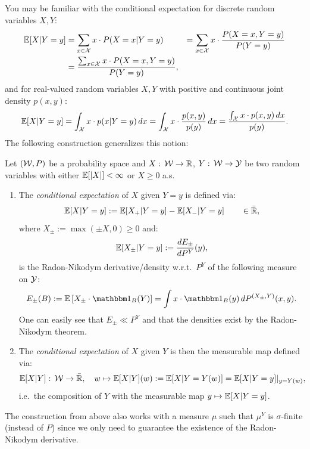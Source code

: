 You may be familiar with the conditional expectation for discrete random variables $X,Y$:
\begin{align*} 
    \mathbb{E}[X|Y=y] &= \sum_{x\in\mathcal{X}} x\cdot P(X=x|Y=y) 
&= \sum_{x \in \mathcal{X}} x \cdot \frac{P(X=x,Y=y)}{P(Y=y)} \\&= \frac{\sum_{x \in \mathcal{X}} x \cdot P(X=x,Y=y)}{P(Y=y)},
\end{align*}
and for real-valued random variables $X,Y$ with positive and continuous joint density $p(x,y)$: 
\[\mathbb{E}[X| Y=y] = \int_{\mathcal{X}} x \cdot p(x| Y=y) \,dx = \int_{\mathcal{X}} x \cdot \frac{p(x,y)}{p(y)} \,dx = \frac{\int_{\mathcal{X}} x \cdot p(x,y)\,dx}{p(y)}.\]
The following construction generalizes this notion:
\begin{Def}
    Let $(\mathcal{W},P)$ be a probability space
    and $X:\, \mathcal{W} \to \mathbb{R}$, $Y:\,\mathcal{W} \to \mathcal{Y}$ be two random variables with 
    either $\mathbb{E}[|X|]< \infty$ or $X \ge 0$ a.s.
\begin{enumerate}
         \item     The \emph{conditional expectation}  of $X$ given $Y=y$ is defined via:
     \[ \mathbb{E}[X|Y=y] := \mathbb{E}[X_+|Y=y] - \mathbb{E}[X_-|Y=y] \qquad \in \bar {\mathbb{R}}, \]
     where $X_\pm:=\max(\pm X,0) \ge 0$ and:
     \[\mathbb{E}[X_\pm|Y=y] := \frac{dE_\pm}{dP^Y}(y),\]
     is the Radon-Nikodym derivative/density w.r.t.\ $P^Y$ of the following measure on $\mathcal{Y}$: 
     \[ E_\pm(B) := \E\lB X_\pm \cdot \I_B(Y) \rB = \int x \cdot \I_B(y) \, dP^{(X_\pm,Y)}(x,y).  \]
     One can easily see that $E_\pm \ll P^Y$ and that the densities exist by the Radon-Nikodym theorem.
 \item The \emph{conditional expectation}  of $X$ given $Y$ is then the measurable map defined via:
     \[\mathbb{E}[X| Y] :\, \mathcal{W} \to \bar{\mathbb{R}},\quad w \mapsto \mathbb{E}[X|Y](w):=\mathbb{E}[X|Y=Y(w)]=\mathbb{E}[X|Y=y]|_{y=Y(w)},\]
     i.e.\ the composition of $Y$ with the measurable map $y \mapsto\mathbb{E}[X|Y=y]$.
\end{enumerate}    
\end{Def}

\begin{Rem}
    The construction from above also works with a measure $\mu$ such that $\mu^Y$ is $\sigma$-finite (instead of $P$) since we only need to guarantee the existence of the Radon-Nikodym derivative.
\end{Rem}

